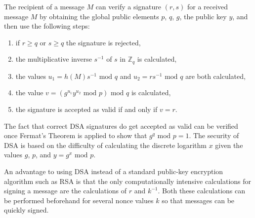 The recipient of a message $M$ can verify a signature $(r,s)$ for a received message $M$ by
obtaining the global public elements $p$, $q$, $g$, the public key $y$, and then use
the following steps:
\begin{enumerate}
  \item if $r\geq q$ or $s\geq q$ the signature is rejected,
  \item the multiplicative inverse $s^{-1}$ of $s$ in $\mathbb{Z}_q$ is calculated,
  \item the values $u_1=h(M)s^{-1}\mbox{ mod }q$ and $u_2=rs^{-1}\mbox{ mod }q$ are both calculated,
  \item the value $v=\left(g^{u_1}y^{u_2}\mbox{ mod }p\right)\mbox{ mod }q$ is calculated,
  \item the signature is accepted as valid if and only if $v=r$.
\end{enumerate}
The fact that correct DSA signatures do get accepted as valid can be verified once Fermat's Theorem
is applied to show that $g^q\mbox{ mod }p=1$. The security of DSA is based on
the difficulty of calculating the discrete logarithm $x$ given the values $g$, $p$,
and $y=g^x\mbox{ mod }p$.

An advantage to using DSA instead of a standard public-key encryption algorithm such as RSA
is that the only computationally intensive calculations for signing a message are the calculations
of $r$ and $k^{-1}$. Both these calculations can be performed beforehand for several
nonce values $k$ so that messages can be quickly signed.

